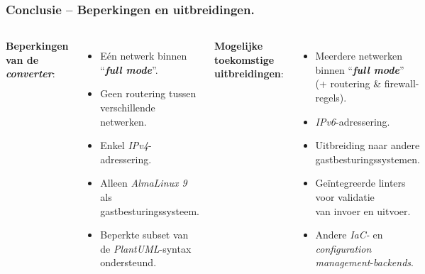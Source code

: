 \documentclass[aspectratio=169]{beamer}
\begin{document}
\begin{frame}
  \frametitle{\LARGE Conclusie -- Beperkingen en uitbreidingen.}
  \centering
  \begin{columns}[t]
    \textbf{Beperkingen van de \emph{converter}}:
    \begin{itemize}
      \item[\textcolor{hgorange}{\large \textbf{-- }}] \footnotesize Eén netwerk binnen ``\textcolor{hgdarkgreen}{\textbf{\emph{full mode}}}''.
      \item[\textcolor{hgorange}{\large \textbf{-- }}] \footnotesize Geen routering tussen verschillende netwerken.
      \item[\textcolor{hgorange}{\large \textbf{-- }}] \footnotesize Enkel \emph{IPv4}-adressering.
      \item[\textcolor{hgorange}{\large \textbf{-- }}] \footnotesize Alleen \emph{AlmaLinux 9} als gastbesturingssysteem.
      \item[\textcolor{hgorange}{\large \textbf{-- }}] \footnotesize Beperkte subset van de \emph{PlantUML}-syntax ondersteund.
    \end{itemize}

    \textbf{Mogelijke toekomstige uitbreidingen}:
    \begin{itemize}
      \item[\textcolor{hglightgreen}{\large \textbf{+ }}] \footnotesize Meerdere netwerken binnen ``\textcolor{hgdarkgreen}{\textbf{\emph{full mode}}}'' \\(+ routering \& firewall-regels).
      \item[\textcolor{hglightgreen}{\large \textbf{+ }}] \footnotesize \emph{IPv6}-adressering.
      \item[\textcolor{hglightgreen}{\large \textbf{+ }}] \footnotesize Uitbreiding naar andere gastbesturingssystemen.
      \item[\textcolor{hglightgreen}{\large \textbf{+ }}] \footnotesize Geïntegreerde linters voor validatie \\van invoer en uitvoer.
      \item[\textcolor{hglightgreen}{\large \textbf{+ }}] \footnotesize Andere \emph{IaC-} en \emph{configuration management}-\emph{backends}.
    \end{itemize}
  \end{columns}
\end{frame}
\end{document}

